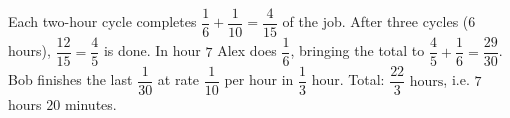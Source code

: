 Each two-hour cycle completes $\dfrac16+\dfrac1{10}=\dfrac4{15}$ of the job. After three cycles ($6$ hours), $\dfrac{12}{15}=\dfrac45$ is done. In hour $7$ Alex does $\dfrac16$, bringing the total to $\dfrac45+\dfrac16=\dfrac{29}{30}$. Bob finishes the last $\dfrac1{30}$ at rate $\dfrac1{10}$ per hour in $\dfrac13$ hour. Total: $\boxed{\dfrac{22}{3}\text{ hours}}$, i.e. $7$ hours $20$ minutes.
